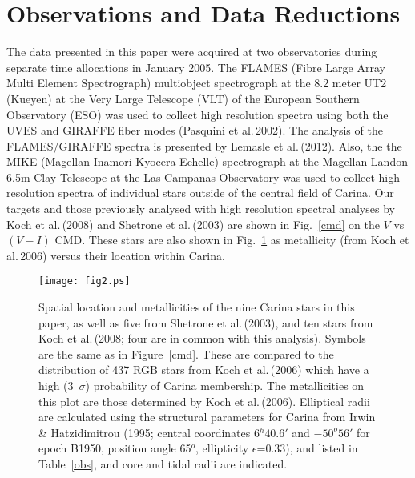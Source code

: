 \documentclass{emulateapj}
\newcommand\etal{{\rm et al.\,}}
\begin{document}

\section{Observations and Data Reductions} 

The data presented in this paper were acquired at two observatories 
during separate time allocations in January 2005. 
The FLAMES (Fibre Large Array Multi Element Spectrograph)  
multiobject spectrograph at the 8.2 meter UT2 
(Kueyen) at the Very Large Telescope (VLT) 
of the European Southern Observatory (ESO) was used
to collect high resolution spectra using both the 
UVES and
GIRAFFE fiber modes (Pasquini \etal  2002).
The analysis of the FLAMES/GIRAFFE spectra is presented 
by Lemasle \etal (2012). 
Also, the the MIKE (Magellan Inamori Kyocera Echelle) spectrograph 
at the Magellan Landon 6.5m Clay Telescope at the Las Campanas Observatory
was used to collect high resolution spectra of individual stars outside
of the central field of Carina.  
%
Our targets and those previously analysed with high resolution spectral
analyses by Koch \etal (2008) and Shetrone \etal (2003) are shown in 
Fig.~\ref{cmd} on the $V$ vs $(V-I)$ CMD.
These stars are also shown in Fig.~\ref{fegrad} as metallicity 
(from Koch \etal 2006) versus their location within Carina.


\begin{figure}[t]
\begin{center}
\texttt{[image: fig2.ps]}
\caption{Spatial location and metallicities of the nine Carina stars 
in this paper, as well as five from Shetrone \etal (2003), and ten 
stars from Koch \etal (2008; four are in common with this analysis). 
Symbols are the same as in Figure~\ref{cmd}.  
These are compared to the distribution of 437 RGB 
stars from Koch \etal (2006) which have a high (3~$\sigma$) 
probability of Carina membership.   
The metallicities
on this plot are those determined by Koch \etal (2006).
Elliptical radii are calculated using the structural 
parameters for Carina from Irwin \& Hatzidimitrou (1995; 
central coordinates 6$^h 40.6'$ and $-50^o 56'$ for epoch 
B1950, position angle 65$^o$, ellipticity $\epsilon$=0.33),
and listed in Table~\ref{obs}, 
and core and tidal radii are indicated.
}
\label{fegrad}
\end{center}
\end{figure}
\end{document}
